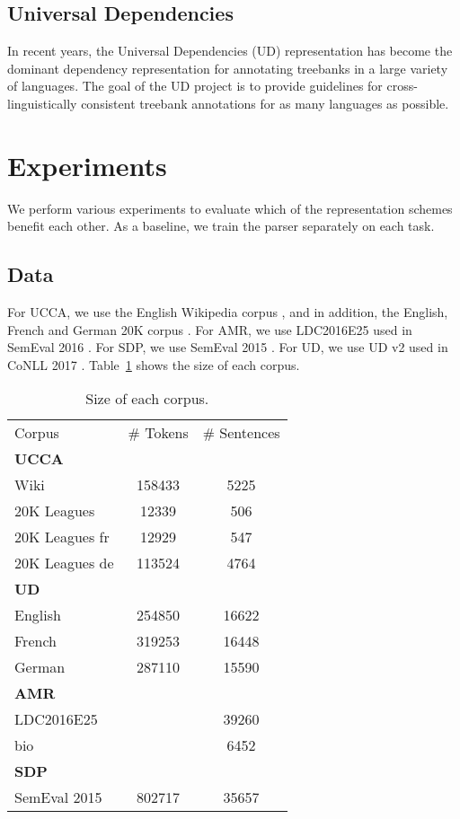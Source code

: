 \documentclass[11pt,a4paper]{article}
\begin{document}
\subsection{Universal Dependencies}\label{sec:ud}

In recent years, the Universal Dependencies
(UD) representation \cite{nivre2016universal} has become
the dominant dependency representation for
annotating treebanks in a large variety of languages.
The goal of the UD project is to provide
guidelines for cross-linguistically consistent treebank
annotations for as many languages as possible.




\section{Experiments}\label{sec:experiments}

We perform various experiments to evaluate which of the representation schemes benefit each other.
As a baseline, we train the parser separately on each task.

\subsection{Data}\label{sec:data}

For UCCA, we use the English Wikipedia corpus \cite{abend2013universal},
and in addition, the English, French and German 20K corpus \cite{sulem2015conceptual}.
For AMR, we use LDC2016E25 used in SemEval 2016 \cite{may2017semeval}.
For SDP, we use SemEval 2015 \cite{oepen2015semeval}.
For UD, we use UD v2 used in CoNLL 2017 \cite{silveira14gold,zeman2017conll}.
Table~\ref{tab:corpora} shows the size of each corpus.

\begin{table}\label{tab:corpora}
\begin{tabular}{lcc}
Corpus & \# Tokens & \# Sentences \\
\textbf{UCCA} \\
Wiki & 158433 & 5225 \\
20K Leagues & 12339 & 506 \\
20K Leagues fr & 12929 & 547 \\
20K Leagues de & 113524 & 4764 \\
\textbf{UD} \\
English & 254850 & 16622 \\
French & 319253 & 16448 \\
German & 287110 & 15590 \\
\textbf{AMR} \\
LDC2016E25 &  & 39260 \\
bio &  & 6452 \\
\textbf{SDP} \\
SemEval 2015 & 802717 & 35657 \\
\end{tabular}
\caption{Size of each corpus.}
\end{table}
\end{document}
